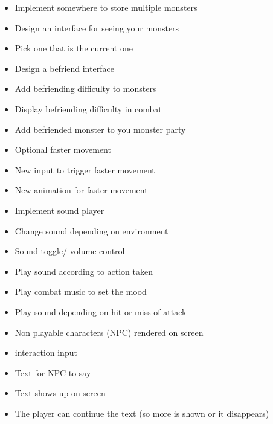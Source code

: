 {\begin{itemize}[+]
	\item Implement somewhere to store multiple monsters
	\item Design an interface for seeing your monsters
	\item Pick one that is the current one
\end{itemize}}
{\begin{itemize}[+]
	\item Design a befriend interface
	\item Add befriending difficulty to monsters
	\item Display befriending difficulty in combat
	\item Add befriended monster to you monster party
\end{itemize}}
{\begin{itemize}[+]
	\item Optional faster movement
	\item New input to trigger faster movement
	\item New animation for faster movement
\end{itemize}}
{\begin{itemize}[+]
	\item Implement sound player
	\item Change sound depending on environment
	\item Sound toggle/ volume control
\end{itemize}}
{\begin{itemize}[+]
	\item Play sound according to action taken
	\item Play combat music to set the mood
	\item Play sound depending on hit or miss of attack
\end{itemize}}
{\begin{itemize}[+]
	\item Non playable characters (NPC) rendered on screen
	\item interaction input
	\item Text for NPC to say
	\item Text shows up on screen
	\item The player can continue the text (so more is shown or it disappears)
\end{itemize}}

